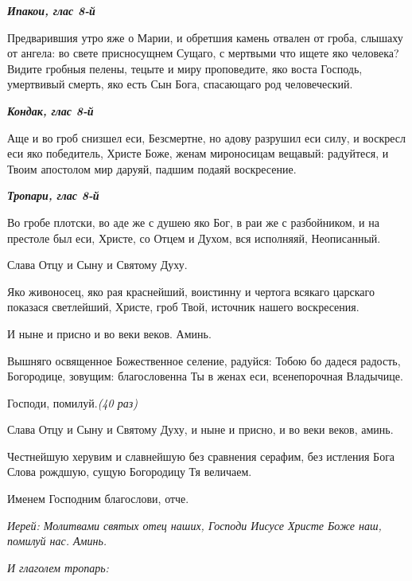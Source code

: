 \medskip\bfseries \itshape Ипакои, глас 8-й

\normalfont{}\normalfont{}Предварившия утро яже о Марии, и обретшия камень отвален от гроба, слышаху от ангела: во свете присносущнем Сущаго, с мертвыми что ищете яко человека? Видите гробныя пелены, тецыте и миру проповедите, яко воста Господь, умертвивый смерть, яко есть Сын Бога, спасающаго род человеческий. 

\medskip\bfseries \itshape Кондак, глас 8-й

\normalfont{}\normalfont{}Аще и во гроб снизшел еси, Безсмертне, но адову разрушил еси силу, и воскресл еси яко победитель, Христе Боже, женам мироносицам вещавый: радуйтеся, и Твоим апостолом мир даруяй, падшим подаяй воскресение. 

\medskip\bfseries \itshape Тропари, глас 8-й

\normalfont{}\normalfont{}Во гробе плотски, во аде же с душею яко Бог, в раи же с разбойником, и на престоле был еси, Христе, со Отцем и Духом, вся исполняяй, Неописанный. 



Слава Отцу и Сыну и Святому Духу.



Яко живоносец, яко рая краснейший, воистинну и чертога всякаго царскаго показася светлейший, Христе, гроб Твой, источник нашего воскресения. 



И ныне и присно и во веки веков. Аминь.



Вышняго освященное Божественное селение, радуйся: Тобою бо дадеся радость, Богородице, зовущим: благословенна Ты в женах еси, всенепорочная Владычице. 



Господи, помилуй.\itshape  (40 раз\normalfont{}) 



Слава Отцу и Сыну и Святому Духу, и ныне и присно, и во веки веков, аминь. 



Честнейшую херувим и славнейшую без сравнения серафим, без истления Бога Слова рождшую, сущую Богородицу Тя величаем. 



Именем Господним благослови, отче. 

\itshape Иерей\normalfont{}: Молитвами святых отец наших, Господи Иисусе Христе Боже наш, помилуй нас. Аминь. 

\itshape И глаголем тропарь:

